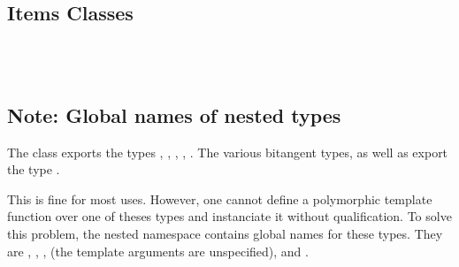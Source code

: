 \subsection*{Items Classes}


\\
\\

\subsection*{Note: Global names of nested types}

The class  exports
the types , , , ,
. The various bitangent types, as well as
 export the type .

This is fine for most uses. However, one cannot define a polymorphic
template function over one of theses types and instanciate it without
qualification. To solve this problem, the nested namespace
 contains global names for these
types. They are , , ,
 (the template arguments are unspecified),
 and .


